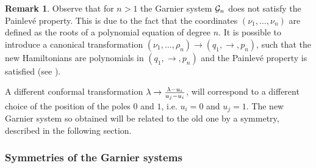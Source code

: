 \documentclass[12pt]{article}
\theoremstyle{definition}
\newtheorem{rmk}[df]{Remark}
\theoremstyle{theorem}
\begin{document}
\begin{rmk}
Observe that for $n>1$ the Garnier system ${\cal G}_n$ does not satisfy the 
Painlev\'e property. This is due to the fact that the coordinates 
$(\nu_1,\dots,\nu_{n})$ are defined as the roots of a
polynomial equation of degree $n$. It is possible to introduce a
canonical transformation 
$(\nu_1,\dots,\rho_{n})\to (q_1,\to,p_{n})$, such that the
new Hamiltonians are polynomials in $(q_1,\to,p_{n})$ and the
Painlev\'e property is satisfied (see \cite{OK}).
\end{rmk}


A different conformal transformation  
$\lambda\to {\lambda-u_{i}\over u_{j}-u_{i}}$, will correspond to a 
different choice of the position of the poles $0$ and $1$, i.e.
$u_i=0$ and $u_j=1$. The new Garnier system so obtained will be
related to the old one by a symmetry, described in the following
section.




\subsubsection{Symmetries of the Garnier systems}
 
\end{document}
